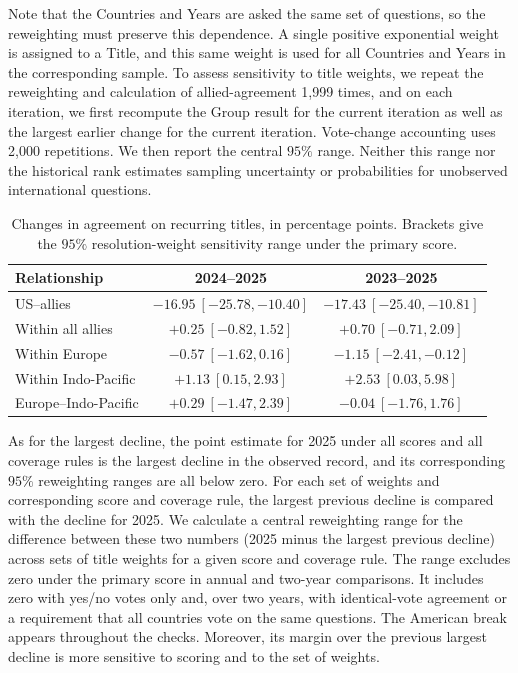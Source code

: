 \documentclass[10pt,authoryear]{elsarticle}
\begin{document}
Note that the Countries and Years are asked the same set of questions, so the reweighting must preserve this dependence. A single positive exponential weight is assigned to a Title, and this same weight is used for all Countries and Years in the corresponding sample. To assess sensitivity to title weights, we repeat the reweighting and calculation of allied-agreement 1,999 times, and on each iteration, we first recompute the Group result for the current iteration as well as the largest earlier change for the current iteration. Vote-change accounting uses 2,000 repetitions. We then report the central $95\%$ range. Neither this range nor the historical rank estimates sampling uncertainty or probabilities for unobserved international questions.

\begin{table}[ht]
\centering\small
\caption{Changes in agreement on recurring titles, in percentage points. Brackets give the $95\%$ resolution-weight sensitivity range under the primary score.}
\begin{tabular}{lcc}
\toprule
Relationship & 2024--2025 & 2023--2025 \\
\midrule
US--allies & $-16.95\ [-25.78,-10.40]$ & $-17.43\ [-25.40,-10.81]$ \\
Within all allies & $+0.25\ [-0.82,1.52]$ & $+0.70\ [-0.71,2.09]$ \\
Within Europe & $-0.57\ [-1.62,0.16]$ & $-1.15\ [-2.41,-0.12]$ \\
Within Indo-Pacific & $+1.13\ [0.15,2.93]$ & $+2.53\ [0.03,5.98]$ \\
Europe--Indo-Pacific & $+0.29\ [-1.47,2.39]$ & $-0.04\ [-1.76,1.76]$ \\
\bottomrule
\end{tabular}
\end{table}

As for the largest decline, the point estimate for 2025 under all scores and all coverage rules is the largest decline in the observed record, and its corresponding $95\%$ reweighting ranges are all below zero. For each set of weights and corresponding score and coverage rule, the largest previous decline is compared with the decline for 2025. We calculate a central reweighting range for the difference between these two numbers (2025 minus the largest previous decline) across sets of title weights for a given score and coverage rule. The range excludes zero under the primary score in annual and two-year comparisons. It includes zero with yes/no votes only and, over two years, with identical-vote agreement or a requirement that all countries vote on the same questions. The American break appears throughout the checks. Moreover, its margin over the previous largest decline is more sensitive to scoring and to the set of weights.
\end{document}
